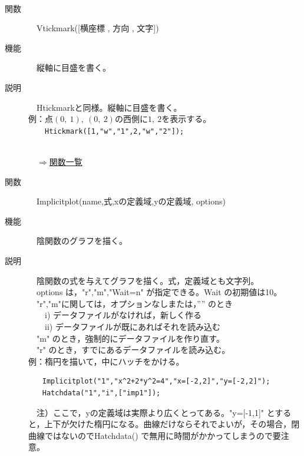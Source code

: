 \documentclass[papersize,a4paper,12pt,uplatex]{jsarticle}
\begin{document}
\begin{description}
\\

\hypertarget{vtickmark}{}
\item[関数]　Vtickmark([横座標 , 方向 , 文字])
\item[機能]　縦軸に目盛を書く。
\item[説明]　Htickmarkと同様。縦軸に目盛を書く。\\

例：点$(0,\ 1),\ (0,\ 2)$の西側に$1,\ 2$を表示する。\\
　　\verb|Htickmark([1,"w","1",2,"w","2"]);|\\
\\

\begin{flushright}　\hyperlink{functionlist}{$\Rightarrow$関数一覧}\end{flushright}

\hypertarget{implicitplot}{}
\item[関数]　Implicitplot(name,式,xの定義域,yの定義域, options)
\item[機能]　陰関数のグラフを描く。
\item[説明]　陰関数の式を与えてグラフを描く。式，定義域とも文字列。\\
　options は，"r","m","Wait=n" が指定できる。Wait の初期値は10。\\
　"r","m"に関しては，オプションなしまたは，”” のとき\\
　　i) データファイルがなければ，新しく作る\\
　　ii) データファイルが既にあればそれを読み込む\\
　"m"  のとき，強制的にデータファイルを作り直す。\\
　"r" のとき，すでにあるデータファイルを読み込む。\\ 

例：楕円を描いて，中にハッチをかける。
\begin{verbatim}
　　Implicitplot("1","x^2+2*y^2=4","x=[-2,2]","y=[-2,2]");
　　Hatchdata("1","i",["imp1"]);
\end{verbatim}
　注）ここで，yの定義域は実際より広くとってある。"y=[-1,1]" とすると，上下が欠けた楕円になる。曲線だけならそれでよいが，その場合，閉曲線ではないのでHatchdata() で無用に時間がかかってしまうので要注意。\\
　\\


\end{description}
\end{document}
